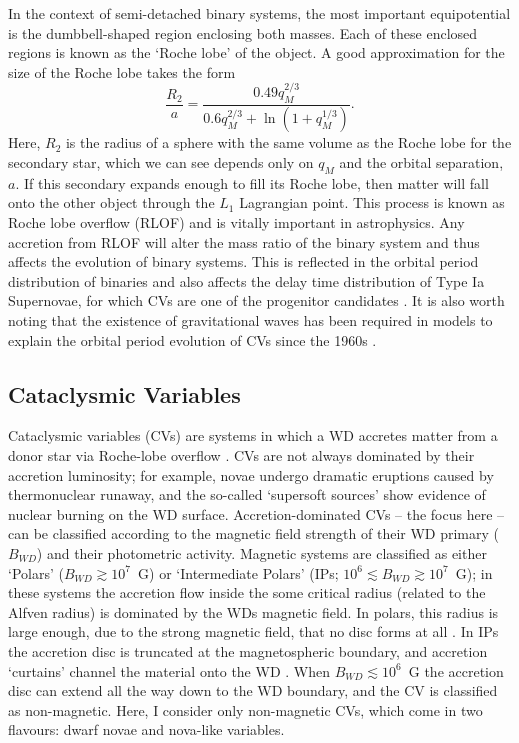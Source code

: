 In the context of semi-detached binary systems, the most important equipotential
is the dumbbell-shaped region enclosing both masses. Each of these
enclosed regions is known as the `Roche lobe' of the object. A good approximation
for the size of the Roche lobe takes the form \citep{eggleton1983}
\begin{equation}
\frac{R_2}{a} = \frac{0.49 q_M^{2/3}}{0.6q_M^{2/3} + \ln(1+q_M^{1/3})}.
\label{eq:roche2}
\end{equation} 
Here, $R_2$ is the radius of a sphere with the same volume as the Roche lobe for the
secondary star, which we can see depends only on $q_M$ and the orbital separation, 
$a$. If this secondary expands enough to fill its Roche lobe, then matter
will fall onto the other object through the $L_1$ Lagrangian point. 
This process is known as Roche lobe overflow (RLOF)
and is vitally important in astrophysics. 
Any accretion from RLOF will alter the mass ratio of the binary system 
and thus affects the evolution of binary systems. 
This is reflected in the orbital period
distribution of binaries \citep[e.g.][]{knigge2011_evo} 
and also affects the delay time distribution
of Type Ia Supernovae, for which CVs are one of the progenitor candidates 
\citep[e.g.][]{wang2012}.
It is also worth noting that the existence of gravitational waves has been 
required in models to explain the orbital period evolution of CVs since
the 1960s \citep{kraft1962}. 


\subsection{Cataclysmic Variables}

Cataclysmic variables (CVs) are systems in which a WD
accretes matter from a donor star via Roche-lobe overflow 
\citep[see the `CV bible', ][]{warnerbook}. 
CVs are not always dominated by their accretion luminosity; 
for example, novae undergo dramatic eruptions caused
by thermonuclear runaway, and the so-called `supersoft sources' show evidence
of nuclear burning on the WD surface.
Accretion-dominated CVs -- the focus here -- can be classified according to the 
magnetic field strength of their WD primary ($B_{WD} $) and their 
photometric activity. 
Magnetic systems are classified as either `Polars' ($B_{WD} \gtrsim 10^7$~G)
or `Intermediate Polars' (IPs; $10^6 \lesssim B_{WD}  \gtrsim 10^7$~G);
in these systems the accretion flow inside the some critical radius 
(related to the Alfven radius)
is dominated by the WDs magnetic field. 
In polars, this radius is large enough, due to the strong magnetic field,
that no disc forms at all \citep{liebert1985}. In IPs the accretion
disc is truncated at the magnetospheric boundary, and accretion `curtains'
channel the material onto the WD \citep[e.g.][]{patterson1994,evans2004}.
When $B_{WD} \lesssim 10^6$~G the accretion disc can extend all the
way down to the WD boundary, and the CV is classified as non-magnetic.
Here, I consider only non-magnetic CVs, which come in two flavours:
dwarf novae and nova-like variables.


